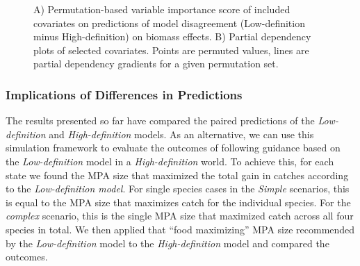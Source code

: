 \documentclass[
  default,
  lineno,
  referee]{sn-jnl}
\begin{document}
\begin{figure}


\caption{\label{fig-biomass-importance}A) Permutation-based variable
importance score of included covariates on predictions of model
disagreement (Low-definition minus High-definition) on biomass effects.
B) Partial dependency plots of selected covariates. Points are permuted
values, lines are partial dependency gradients for a given permutation
set.}

\end{figure}%

\subsubsection{Implications of Differences in
Predictions}\label{sec-imps}

The results presented so far have compared the paired predictions of the
\emph{Low-definition} and \emph{High-definition} models. As an
alternative, we can use this simulation framework to evaluate the
outcomes of following guidance based on the \emph{Low-definition} model
in a \emph{High-definition} world. To achieve this, for each state we
found the MPA size that maximized the total gain in catches according to
the \emph{Low-definition model}. For single species cases in the
\emph{Simple} scenarios, this is equal to the MPA size that maximizes
catch for the individual species. For the \emph{complex} scenario, this
is the single MPA size that maximized catch across all four species in
total. We then applied that ``food maximizing'' MPA size recommended by
the \emph{Low-definition} model to the \emph{High-definition} model and
compared the outcomes.
\end{document}
